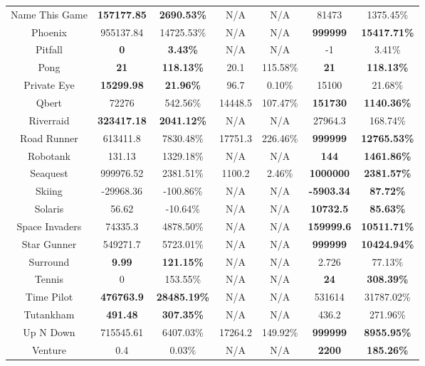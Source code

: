 \begin{table}[!hb]
\begin{center}
\begin{tabular}{c cc cc cc }
        Name This Game & \textbf{157177.85} & \textbf{2690.53\%} & N/A & N/A & 81473 & 1375.45\% \\  
        Phoenix & 955137.84 & 14725.53\% & N/A & N/A & \textbf{999999} & \textbf{15417.71\%} \\  
        Pitfall & \textbf{0} & \textbf{3.43\%} & N/A & N/A & -1 & 3.41\% \\  
        Pong & \textbf{21} & \textbf{118.13\%} & 20.1 & 115.58\% & \textbf{21} & \textbf{118.13\%} \\  
        Private Eye & \textbf{15299.98} & \textbf{21.96\%} & 96.7 & 0.10\% & 15100 & 21.68\% \\  
        Qbert & 72276 & 542.56\% & 14448.5 & 107.47\% & \textbf{151730} & \textbf{1140.36\%} \\  
        Riverraid & \textbf{323417.18} & \textbf{2041.12\%} & N/A & N/A & 27964.3 & 168.74\% \\  
        Road Runner & 613411.8 & 7830.48\% & 17751.3 & 226.46\% & \textbf{999999} & \textbf{12765.53\%} \\  
        Robotank & 131.13 & 1329.18\% & N/A & N/A & \textbf{144} & \textbf{1461.86\%} \\  
        Seaquest & 999976.52 & 2381.51\% & 1100.2 & 2.46\% & \textbf{1000000}& \textbf{2381.57\%} \\  
        Skiing & -29968.36 & -100.86\% & N/A & N/A & \textbf{-5903.34} & \textbf{87.72\%} \\  
        Solaris & 56.62 & -10.64\% & N/A & N/A & \textbf{10732.5} & \textbf{85.63\%} \\  
        Space Invaders & 74335.3 & 4878.50\% & N/A & N/A & \textbf{159999.6} & \textbf{10511.71\%} \\  
        Star Gunner & 549271.7 & 5723.01\% & N/A & N/A & \textbf{999999} & \textbf{10424.94\%} \\  
        Surround & \textbf{9.99} & \textbf{121.15\%} & N/A & N/A & 2.726 & 77.13\% \\  
        Tennis & 0 & 153.55\% & N/A & N/A & \textbf{24} & \textbf{308.39\%} \\  
        Time Pilot & \textbf{476763.9} & \textbf{28485.19\%} & N/A & N/A & 531614 & 31787.02\% \\  
        Tutankham & \textbf{491.48} & \textbf{307.35\%} & N/A & N/A & 436.2 & 271.96\% \\  
        Up N Down & 715545.61 & 6407.03\% & 17264.2 & 149.92\% & \textbf{999999} & \textbf{8955.95\%} \\  
        Venture & 0.4 & 0.03\% & N/A & N/A & \textbf{2200} & \textbf{185.26\%} \\  

\end{tabular}
\end{center}
\end{table}
